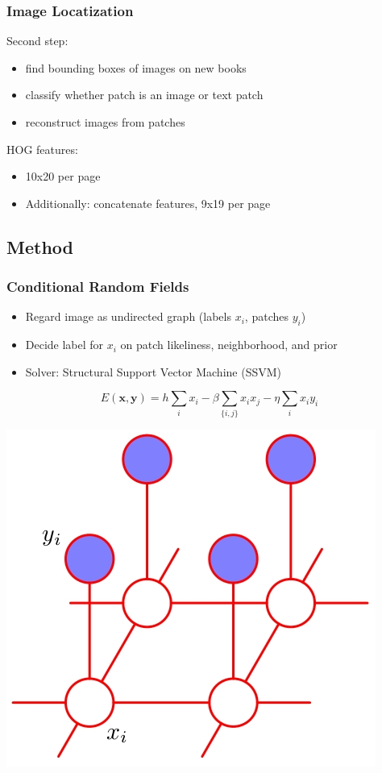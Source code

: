 
\begin{frame}
\frametitle{Image Locatization}
Second step:
\begin{itemize}
\item find bounding boxes of images on new books
\item classify whether patch is an image or text patch
\item reconstruct images from patches
\end{itemize}
HOG features:
\begin{itemize}
\item 10x20 per page
\item Additionally: concatenate features, 9x19 per page
\end{itemize}
\end{frame}

\subsection{Method}
\begin{frame}
\frametitle{Conditional Random Fields}
\begin{itemize}
\item Regard image as undirected graph (labels $x_i$, patches $y_i$)
\item Decide label for $x_i$ on patch likeliness, neighborhood, and prior
\item Solver: Structural Support Vector Machine (SSVM)
\end{itemize}
$$ E(\mathbf{x}, \mathbf{y}) = h\sum_i x_i - \beta \sum_{\{i, j\}} x_i x_j
- \eta \sum_i x_i y_i $$

\includegraphics[width=.3\paperwidth]{resources/crf}
\end{frame}

